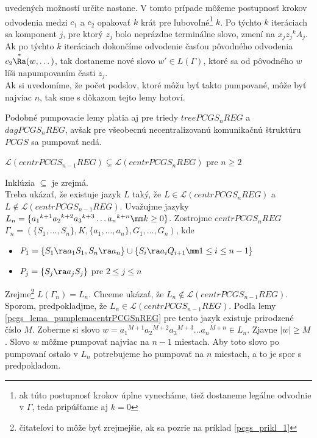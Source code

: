 \begin{dokaz}
uvedených možností určite nastane. V tomto prípade môžeme
postupnosť krokov odvodenia medzi $c_1$ a $c_2$ opakovať $k$ krát
pre ľubovoľné\footnote{ak túto postupnosť krokov úplne vynecháme,
tiež dostaneme legálne odvodnie v $\Gamma$, teda pripúšťame aj
$k=0$ } $k$. Po týchto $k$ iteráciach sa komponent $j$, pre ktorý
$z_j$ bolo neprázdne terminálne slovo, zmení na $x_j{z_j}^kA_j$.
Ak po týchto $k$ ite\-rá\-ciach dokončíme odvodenie časťou pôvodného
odvodenia $c_2\overset{*}\Ra (w,\dots )$, tak dostaneme nové slovo
$w'\in L(\Gamma)$, ktoré sa od pôvodného $w$ líši napumpovaním
časti $z_j$. \\ Ak si uvedomíme, že počet podslov, ktoré môžu byť
takto pumpované, môže byť najviac $n$, tak sme s dôkazom tejto
lemy hotoví.
\end{dokaz}

\smallskip

Podobné pumpovacie lemy platia aj pre triedy $treePCGS_nREG$
a $dagPCGS_nREG$, avšak pre všeobecnú necentralizovanú
komunikačnú štruktúru $PCGS$ sa pumpovať nedá.

\begin{veta}
$\mathcal{L}(centrPCGS_{n-1}REG)\subsetneq\mathcal{L}(centrPCGS_nREG)$
pre $n\geq 2$
\end{veta}

\begin{dokaz}
Inklúzia $\subseteq$ je zrejmá.
\\ Treba ukázať, že existuje jazyk
$L$ taký, že $L\in\mathcal{L}(centrPCGS_nREG)$ a\newline
$L\not\in\mathcal{L}(centrPCGS_{n-1}REG)$. Uvažujme jazyky $L_n=\{
{a_1}^{k+1}{a_2}^{k+2}{a_3}^{k+3}\dots {a_n}^{k+n}\mm k\geq 0\}$.
Zostrojme $centrPCGS_nREG$ $\Gamma_n=(\{S_1,\dots
,S_n\},K,\{a_1,\dots ,a_n\},G_1,\dots ,G_n)$, kde
\begin{itemize}
  \item $P_1=\{S_1\ra a_1S_1,S_n\ra a_n\}\cup\{ S_i\ra a_iQ_{i+1}\mm 1\leq
  i\leq n-1\}$
  \item $P_j=\{S_j\ra a_jS_j\}$ pre $2\leq j\leq n$
\end{itemize}
Zrejme\footnote{čitateľovi
 to môže byť zrejmejšie, ak sa pozrie na príklad \ref{pcgs_prikl_1}}
$L(\Gamma_n)=L_n$. Chceme ukázať, že
$L_n\not\in\mathcal{L}(centrPCGS_{n-1}REG)$. Sporom,
predpokladjme, že $L_n\in\mathcal{L}(centrPCGS_{n-1}REG)$. Podľa
lemy \ref{pcgs_lema_pumplemacentrPCGSnREG} pre tento jazyk existuje
prirodzené číslo $M$. Zoberme si slovo
$w={a_1}^{M+1}{a_2}^{M+2}{a_3}^{M+3}\dots {a_n}^{M+n}\in L_n$.
Zjavne $|w|\geq M$. Slovo $w$ môžme pumpovať najviac na $n-1$
miestach. Aby toto slovo po pumpovaní ostalo v $L_n$ potrebujeme
ho pumpovať na $n$ miestach, a to je spor s predpokladom.
\end{dokaz}

